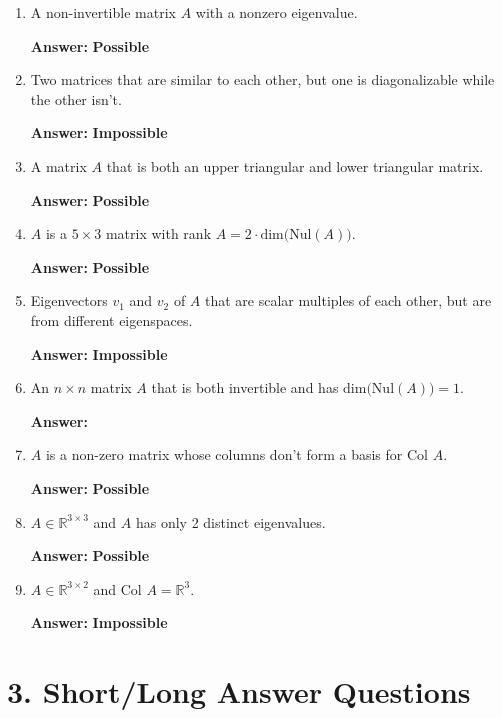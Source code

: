 \documentclass{article}
\begin{document}
\begin{enumerate}[label= 2.\arabic*,left=0pt]
    \item A non-invertible matrix $A$ with a nonzero eigenvalue.
    
    \textbf{Answer:} \textbf{Possible}
    
    \item Two matrices that are similar to each other, but one is diagonalizable while the other isn't.
    
    \textbf{Answer:} \textbf{Impossible}
    
    \item A matrix $A$ that is both an upper triangular and lower triangular matrix.
    
    \textbf{Answer:} \textbf{Possible}
    
    \item $A$ is a $5 \times 3$ matrix with rank $A = 2 \cdot \text{dim(Nul}(A))$.
    
    \textbf{Answer:} \textbf{Possible}
    
    \item Eigenvectors $v_1$ and $v_2$ of $A$ that are scalar multiples of each other, but are from different eigenspaces.
    
    \textbf{Answer:} \textbf{Impossible}
    
    \item An $n \times n$ matrix $A$ that is both invertible and has $\text{dim(Nul}(A)) = 1$.
    
    \textbf{Answer:} \underline{\hspace{1cm}}
    
    \item $A$ is a non-zero matrix whose columns don't form a basis for Col $A$.
    
    \textbf{Answer:} \textbf{Possible}
    
    \item $A \in \mathbb{R}^{3 \times 3}$ and $A$ has only 2 distinct eigenvalues.
    
    \textbf{Answer:} \textbf{Possible}
    
    \item $A \in \mathbb{R}^{3 \times 2}$ and Col $A = \mathbb{R}^3$.
    
    \textbf{Answer:} \textbf{Impossible}
\end{enumerate}

\section*{3. Short/Long Answer Questions}
\end{document}
